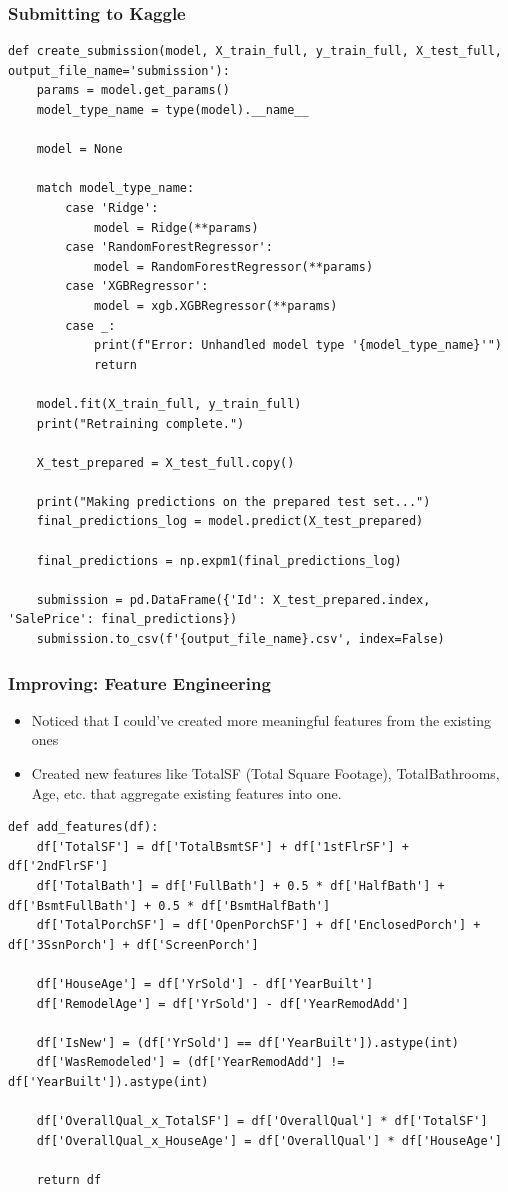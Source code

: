 \documentclass{beamer}
\begin{document}
\begin{frame}[fragile]
\frametitle{Submitting to Kaggle}

\begin{verbatim}
def create_submission(model, X_train_full, y_train_full, X_test_full, output_file_name='submission'):
    params = model.get_params()
    model_type_name = type(model).__name__

    model = None

    match model_type_name:
        case 'Ridge':
            model = Ridge(**params)
        case 'RandomForestRegressor':
            model = RandomForestRegressor(**params)
        case 'XGBRegressor':
            model = xgb.XGBRegressor(**params)
        case _:
            print(f"Error: Unhandled model type '{model_type_name}'")
            return

    model.fit(X_train_full, y_train_full)
    print("Retraining complete.")
    
    X_test_prepared = X_test_full.copy()
    
    print("Making predictions on the prepared test set...")
    final_predictions_log = model.predict(X_test_prepared)
    
    final_predictions = np.expm1(final_predictions_log)
    
    submission = pd.DataFrame({'Id': X_test_prepared.index, 'SalePrice': final_predictions})
    submission.to_csv(f'{output_file_name}.csv', index=False)
\end{verbatim}
\end{frame}

\begin{frame}[fragile]
\frametitle{Improving: Feature Engineering}
\begin{itemize}
    \item Noticed that I could've created more meaningful features from the existing ones
    \item Created new features like TotalSF (Total Square Footage), TotalBathrooms, Age, etc. that aggregate existing features into one.
\end{itemize}

\begin{verbatim}
def add_features(df):
    df['TotalSF'] = df['TotalBsmtSF'] + df['1stFlrSF'] + df['2ndFlrSF']
    df['TotalBath'] = df['FullBath'] + 0.5 * df['HalfBath'] + df['BsmtFullBath'] + 0.5 * df['BsmtHalfBath']
    df['TotalPorchSF'] = df['OpenPorchSF'] + df['EnclosedPorch'] + df['3SsnPorch'] + df['ScreenPorch']

    df['HouseAge'] = df['YrSold'] - df['YearBuilt']
    df['RemodelAge'] = df['YrSold'] - df['YearRemodAdd']

    df['IsNew'] = (df['YrSold'] == df['YearBuilt']).astype(int)
    df['WasRemodeled'] = (df['YearRemodAdd'] != df['YearBuilt']).astype(int)

    df['OverallQual_x_TotalSF'] = df['OverallQual'] * df['TotalSF']
    df['OverallQual_x_HouseAge'] = df['OverallQual'] * df['HouseAge']

    return df
\end{verbatim}
\end{frame}
\end{document}
